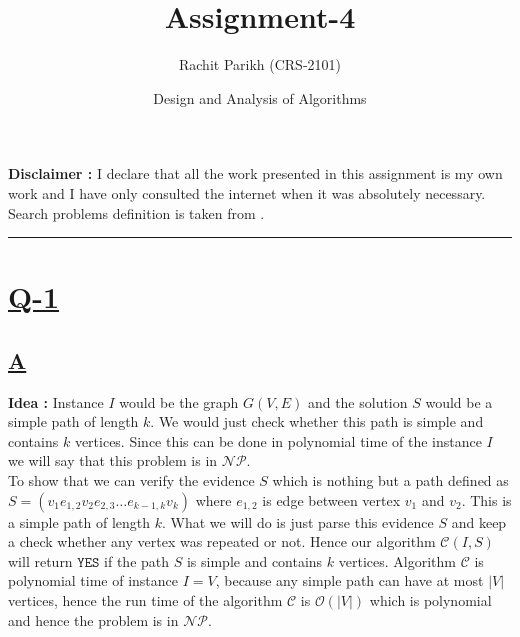 \documentclass[14pt]{article}
\begin{document}
	
	\title{\color{blue}\Huge \textbf{Assignment-4}} 
	\date{\Large Design and Analysis of Algorithms}
	\author{Rachit Parikh (CRS-2101)}
	
	\maketitle
	\textbf{Disclaimer :} I declare that all the work presented in this assignment is my own work and I have only consulted the internet when it was absolutely necessary. Search problems definition is taken from \cite{pajeet}.
	
	\noindent
	\rule{\linewidth}{0.4pt}
	
	\section*{\underline{Q-1}}
		\subsection*{\underline{A}}
			\noindent
			\newline
			\textbf{Idea : }Instance $I$ would be the graph $G(V, E)$ and the solution $S$ would be a simple path of length $k$. We would just check whether this path is simple and contains $k$ vertices. Since this can be done in polynomial time of the instance $I$ we will say that this problem is in $\mathcal{NP}$.\\
			\newline
			To show that we can verify the evidence $S$ which is nothing but a path defined as $S = (v_1e_{1,2}v_2e_{2,3}\dots e_{k-1,k}v_k)$ where $e_{1,2}$ is edge between vertex $v_1$ and $v_2$. This is a simple path of length $k$. What we will do is just parse this evidence $S$ and keep a check whether any vertex was repeated or not. Hence our algorithm $\mathcal{C}(I, S)$ will return $\mathtt{YES}$ if the path $S$ is simple and contains $k$ vertices. Algorithm $\mathcal{C}$ is polynomial time of instance $I = V$, because any simple path can have at most $|V|$ vertices, hence the run time of the algorithm $\mathcal{C}$ is $\mathcal{O}(|V|)$ which is polynomial and hence the problem is in $\mathcal{NP}$.\\
			\newline
			
\end{document}
